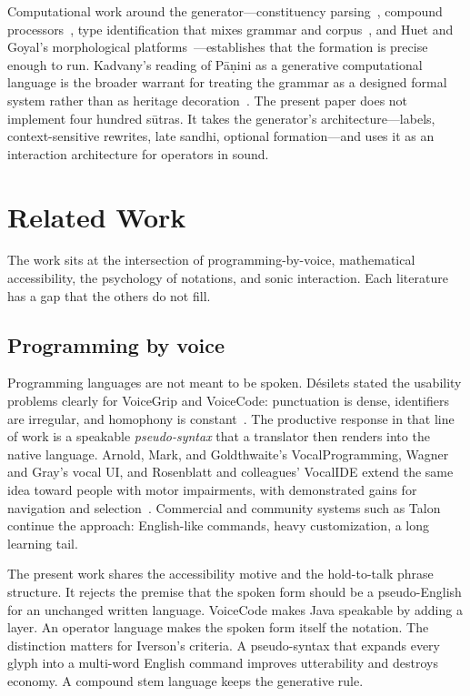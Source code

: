 \documentclass[manuscript, review, anonymous]{acmart}
\begin{document}
Computational work around the generator---constituency parsing~\cite{Kulkarni2011Parser}, compound processors~\cite{Kumar2010Processor}, type identification that mixes grammar and corpus~\cite{Krishna2016Compound}, and Huet and Goyal's morphological platforms~\cite{Huet2009Formal,Goyal2013Reader}---establishes that the formation is precise enough to run. Kadvany's reading of P{\=a}{\d{n}}ini as a generative computational language is the broader warrant for treating the grammar as a designed formal system rather than as heritage decoration~\cite{Kadvany2014Panini}. The present paper does not implement four hundred s{\=u}tras. It takes the generator's architecture---labels, context-sensitive rewrites, late sandhi, optional formation---and uses it as an interaction architecture for operators in sound.

\section{Related Work}
\label{sec:related}

The work sits at the intersection of programming-by-voice, mathematical accessibility, the psychology of notations, and sonic interaction. Each literature has a gap that the others do not fill.

\subsection{Programming by voice}

Programming languages are not meant to be spoken. D{\'e}silets stated the usability problems clearly for VoiceGrip and VoiceCode: punctuation is dense, identifiers are irregular, and homophony is constant~\cite{Desilets2001VoiceGrip,Desilets2006VoiceCode}. The productive response in that line of work is a speakable \emph{pseudo-syntax} that a translator then renders into the native language. Arnold, Mark, and Goldthwaite's VocalProgramming, Wagner and Gray's vocal UI, and Rosenblatt and colleagues' VocalIDE extend the same idea toward people with motor impairments, with demonstrated gains for navigation and selection~\cite{Arnold2000VocalProgramming,Wagner2015Vocal,RosenblattVocalIDE}. Commercial and community systems such as Talon continue the approach: English-like commands, heavy customization, a long learning tail.

The present work shares the accessibility motive and the hold-to-talk phrase structure. It rejects the premise that the spoken form should be a pseudo-English for an unchanged written language. VoiceCode makes Java speakable by adding a layer. An operator language makes the spoken form itself the notation. The distinction matters for Iverson's criteria. A pseudo-syntax that expands every glyph into a multi-word English command improves utterability and destroys economy. A compound stem language keeps the generative rule.
\end{document}
